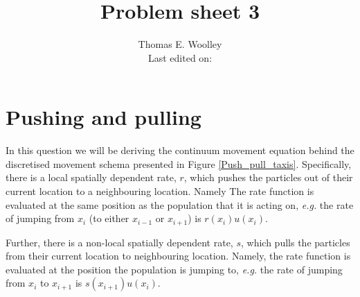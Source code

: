 \documentclass[10pt]{article}
\newcommand{\fig}[1]{Figure \ref{#1}}
\newcommand{\eg}{\emph{e.g.} }
\begin{document}


\title{Problem sheet 3}
\author{Thomas E. Woolley\\Last edited on:}
\maketitle
\section{Pushing and pulling}\label{Pushing and pulling}
In this question we will be deriving the continuum movement equation behind the discretised movement schema presented in \fig{Push_pull_taxis}. Specifically, there is a local spatially dependent rate, $r$, which pushes the particles out of their current location to a neighbouring location. Namely The rate function is evaluated at the same position as the population that it is acting on, \eg the rate of jumping from  $x_i$ (to either $x_{i-1}$ or $x_{i+1}$) is $r(x_i)u(x_i)$.

Further, there is a non-local spatially dependent rate, $s$, which pulls the particles from their current location to neighbouring location. Namely, the rate function is evaluated at the position the population is jumping to, \eg the rate of jumping from $x_i$ to $x_{i+1}$ is $s(x_{i+1})u(x_i)$.
\end{document}
